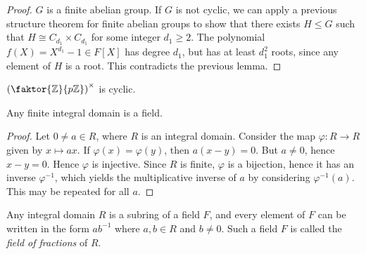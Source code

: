 \begin{proof}
	\( G \) is a finite abelian group.
	If \( G \) is not cyclic, we can apply a previous structure theorem for finite abelian groups to show that there exists \( H \leq G \) such that \( H \cong C_{d_1} \times C_{d_1} \) for some integer \( d_1 \geq 2 \).
	The polynomial \( f(X) = X^{d_1} - 1 \in F[X] \) has degree \( d_1 \), but has at least \( d_1^2 \) roots, since any element of \( H \) is a root.
	This contradicts the previous lemma.
\end{proof}
\begin{example}
	\( \qty(\faktor{\mathbb Z}{p\mathbb Z})^\times \) is cyclic.
\end{example}
\begin{proposition}
	Any finite integral domain is a field.
\end{proposition}
\begin{proof}
	Let \( 0 \neq a \in R \), where \( R \) is an integral domain.
	Consider the map \( \varphi \colon R \to R \) given by \( x \mapsto ax \).
	If \( \varphi(x) = \varphi(y) \), then \( a(x-y) = 0 \).
	But \( a \neq 0 \), hence \( x - y = 0 \).
	Hence \( \varphi \) is injective.
	Since \( R \) is finite, \( \varphi \) is a bijection, hence it has an inverse \( \varphi^{-1} \), which yields the multiplicative inverse of \( a \) by considering \( \varphi^{-1}(a) \).
	This may be repeated for all \( a \).
\end{proof}
\begin{theorem}
	Any integral domain \( R \) is a subring of a field \( F \), and every element of \( F \) can be written in the form \( ab^{-1} \) where \( a, b \in R \) and \( b \neq 0 \).
	Such a field \( F \) is called the \textit{field of fractions} of \( R \).
\end{theorem}
